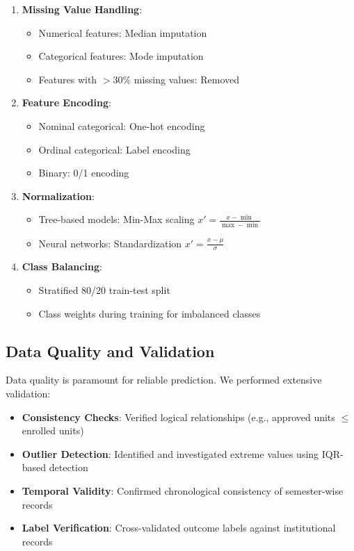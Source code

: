 \documentclass[journal]{IEEEtran}
\begin{document}
\begin{enumerate}
\item \textbf{Missing Value Handling}:
\begin{itemize}
\item Numerical features: Median imputation
\item Categorical features: Mode imputation
\item Features with $>$30\% missing values: Removed
\end{itemize}

\item \textbf{Feature Encoding}:
\begin{itemize}
\item Nominal categorical: One-hot encoding
\item Ordinal categorical: Label encoding
\item Binary: 0/1 encoding
\end{itemize}

\item \textbf{Normalization}:
\begin{itemize}
\item Tree-based models: Min-Max scaling $x' = \frac{x - \min}{\max - \min}$
\item Neural networks: Standardization $x' = \frac{x - \mu}{\sigma}$
\end{itemize}

\item \textbf{Class Balancing}:
\begin{itemize}
\item Stratified 80/20 train-test split
\item Class weights during training for imbalanced classes
\end{itemize}
\end{enumerate}

\subsection{Data Quality and Validation}

Data quality is paramount for reliable prediction. We performed extensive validation:

\begin{itemize}
\item \textbf{Consistency Checks}: Verified logical relationships (e.g., approved units $\leq$ enrolled units)
\item \textbf{Outlier Detection}: Identified and investigated extreme values using IQR-based detection
\item \textbf{Temporal Validity}: Confirmed chronological consistency of semester-wise records
\item \textbf{Label Verification}: Cross-validated outcome labels against institutional records
\end{itemize}
\end{document}
